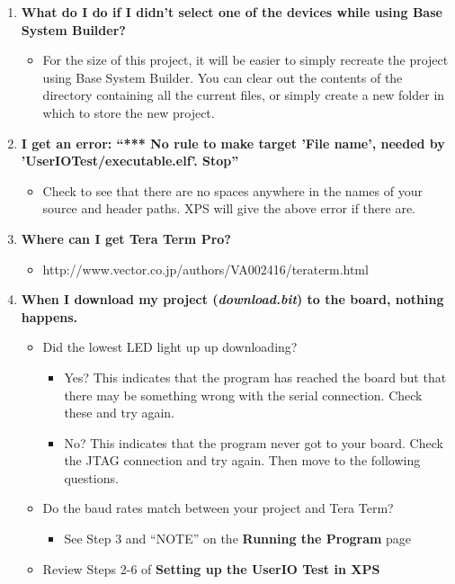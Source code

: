 \begin{enumerate}
			\item \textbf{What do I do if I didn't select one of the devices while using Base System Builder?}
				\begin{itemize}
					\item For the size of this project, it will be easier to simply recreate the project using Base System Builder. You can clear out the contents of the directory containing all the current files, or simply create a new folder in which to store the new project.
				\end{itemize}
			\item \textbf{I get an error: ``*** No rule to make target 'File name', needed by 'UserIOTest/executable.elf'. Stop''} 
				\begin{itemize}
					\item Check to see that there are no spaces anywhere in the names of your source and header paths. XPS will give the above error if there are.
				\end{itemize}
			\item \textbf{Where can I get Tera Term Pro?}
				\begin{itemize}
					\item http://www.vector.co.jp/authors/VA002416/teraterm.html
				\end{itemize}
			\item \textbf{When I download my project (\textit{download.bit}) to the board, nothing happens.}
				\begin{itemize}
					\item Did the lowest LED light up up downloading?
						\begin{itemize}
							\item Yes? This indicates that the program has reached the board but that there may be something wrong with the serial connection. Check these and try again.
							\item No? This indicates that the program never got to your board. Check the JTAG connection and try again. Then move to the following questions.
						\end{itemize} 
					\item Do the baud rates match between your project and Tera Term?
						\begin{itemize}
							\item See Step 3 and ``NOTE'' on the \textbf{Running the Program} page
						\end{itemize}
					\item Review Steps 2-6 of \textbf{Setting up the UserIO Test in XPS}

\end{itemize}
\end{enumerate}
